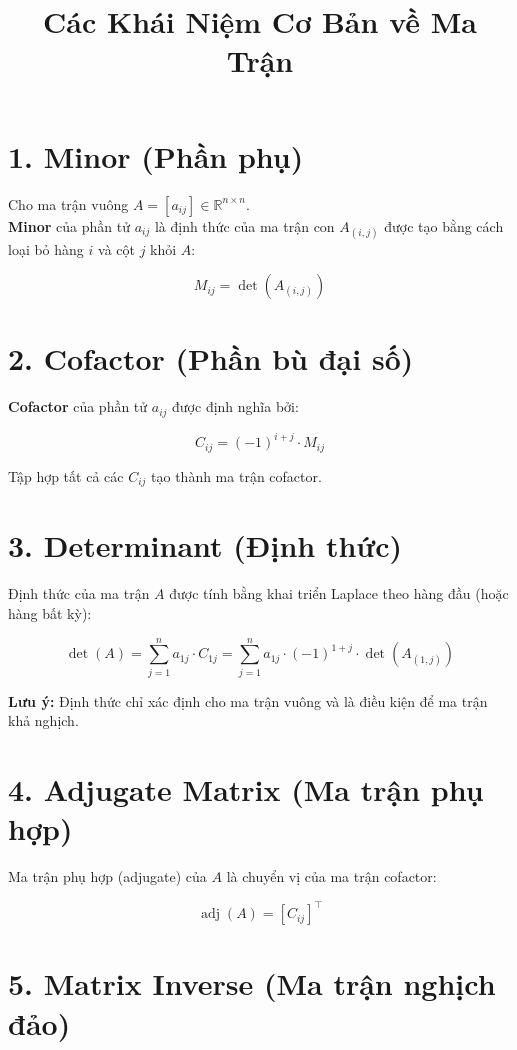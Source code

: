 \documentclass[12pt,a4paper]{article}
\title{\textbf{Các Khái Niệm Cơ Bản về Ma Trận}}
\author{}
\date{}
\begin{document}
\maketitle

\section*{1. Minor (Phần phụ)}

Cho ma trận vuông $A = [a_{ij}] \in \mathbb{R}^{n \times n}$. \\
\textbf{Minor} của phần tử $a_{ij}$ là định thức của ma trận con $A_{(i,j)}$ được tạo bằng cách loại bỏ hàng $i$ và cột $j$ khỏi $A$:

\[
M_{ij} = \det(A_{(i,j)})
\]

\section*{2. Cofactor (Phần bù đại số)}

\textbf{Cofactor} của phần tử $a_{ij}$ được định nghĩa bởi:

\[
C_{ij} = (-1)^{i + j} \cdot M_{ij}
\]

Tập hợp tất cả các $C_{ij}$ tạo thành ma trận cofactor.

\section*{3. Determinant (Định thức)}

Định thức của ma trận $A$ được tính bằng khai triển Laplace theo hàng đầu (hoặc hàng bất kỳ):

\[
\det(A) = \sum_{j=1}^{n} a_{1j} \cdot C_{1j} = \sum_{j=1}^{n} a_{1j} \cdot (-1)^{1+j} \cdot \det(A_{(1,j)})
\]

\textbf{Lưu ý:} Định thức chỉ xác định cho ma trận vuông và là điều kiện để ma trận khả nghịch.

\section*{4. Adjugate Matrix (Ma trận phụ hợp)}

Ma trận phụ hợp (adjugate) của $A$ là chuyển vị của ma trận cofactor:

\[
\operatorname{adj}(A) = \left[ C_{ij} \right]^\top
\]

\section*{5. Matrix Inverse (Ma trận nghịch đảo)}
\end{document}
